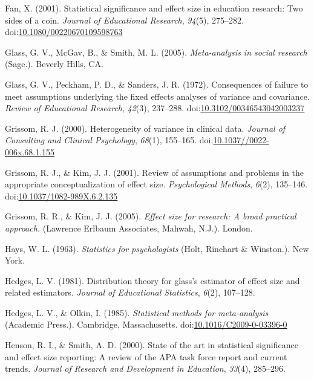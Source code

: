 \documentclass[
  man]{apa6}
\begin{document}
\leavevmode\hypertarget{ref-Fan_2001}{}%
Fan, X. (2001). Statistical significance and effect size in education research: Two sides of a coin. \emph{Journal of Educational Research}, \emph{94}(5), 275--282. doi:\href{https://doi.org/10.1080/00220670109598763}{10.1080/00220670109598763}

\leavevmode\hypertarget{ref-Glass_et_al_1981}{}%
Glass, G. V., McGav, B., \& Smith, M. L. (2005). \emph{Meta-analysis in social research} (Sage.). Beverly Hills, CA.

\leavevmode\hypertarget{ref-Glass_et_al_1972}{}%
Glass, G. V., Peckham, P. D., \& Sanders, J. R. (1972). Consequences of failure to meet assumptions underlying the fixed effects analyses of variance and covariance. \emph{Review of Educational Research}, \emph{42}(3), 237--288. doi:\href{https://doi.org/10.3102/00346543042003237}{10.3102/00346543042003237}

\leavevmode\hypertarget{ref-Grissom_2000}{}%
Grissom, R. J. (2000). Heterogeneity of variance in clinical data. \emph{Journal of Consulting and Clinical Psychology}, \emph{68}(1), 155--165. doi:\href{https://doi.org/10.1037//0022-006x.68.1.155}{10.1037//0022-006x.68.1.155}

\leavevmode\hypertarget{ref-Grissom_Kim_2001}{}%
Grissom, R. J., \& Kim, J. J. (2001). Review of assumptions and problems in the appropriate conceptualization of effect size. \emph{Psychological Methods}, \emph{6}(2), 135--146. doi:\href{https://doi.org/10.1037/1082-989X.6.2.135}{10.1037/1082-989X.6.2.135}

\leavevmode\hypertarget{ref-Grissom_and_kim_2005}{}%
Grissom, R. R., \& Kim, J. J. (2005). \emph{Effect size for research: A broad practical approach.} (Lawrence Erlbaum Associates, Mahwah, N.J.). London.

\leavevmode\hypertarget{ref-Hays_1963}{}%
Hays, W. L. (1963). \emph{Statistics for psychologists} (Holt, Rinehart \& Winston.). New York.

\leavevmode\hypertarget{ref-Hedges_1981}{}%
Hedges, L. V. (1981). Distribution theory for glass's estimator of effect size and related estimators. \emph{Journal of Educational Statistics}, \emph{6}(2), 107--128.

\leavevmode\hypertarget{ref-Hedges_Olkin_1985}{}%
Hedges, L. V., \& Olkin, I. (1985). \emph{Statistical methods for meta-analysis} (Academic Press.). Cambridge, Massachusetts. doi:\href{https://doi.org/10.1016/C2009-0-03396-0}{10.1016/C2009-0-03396-0}

\leavevmode\hypertarget{ref-Henson_Smith_2000}{}%
Henson, R. I., \& Smith, A. D. (2000). State of the art in statistical significance and effect size reporting: A review of the APA task force report and current trends. \emph{Journal of Research and Development in Education}, \emph{33}(4), 285--296.
\end{document}
